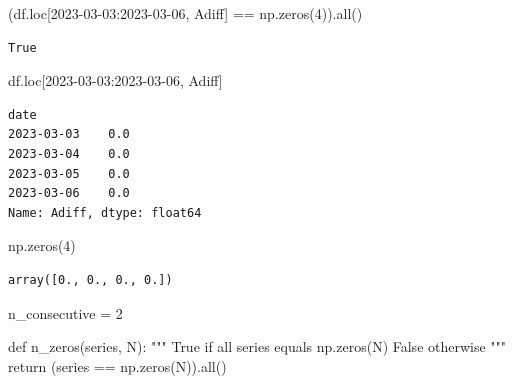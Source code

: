 \documentclass[
  letterpaper,
  DIV=11,
  numbers=noendperiod,
  oneside]{scrreprt}
\newenvironment{Shaded}{\begin{snugshade}}{\end{snugshade}}
\newcommand{\BuiltInTok}[1]{\textcolor[rgb]{0.00,0.23,0.31}{#1}}
\newcommand{\CommentTok}[1]{\textcolor[rgb]{0.37,0.37,0.37}{#1}}
\newcommand{\ControlFlowTok}[1]{\textcolor[rgb]{0.00,0.23,0.31}{#1}}
\newcommand{\DecValTok}[1]{\textcolor[rgb]{0.68,0.00,0.00}{#1}}
\newcommand{\KeywordTok}[1]{\textcolor[rgb]{0.00,0.23,0.31}{#1}}
\newcommand{\NormalTok}[1]{\textcolor[rgb]{0.00,0.23,0.31}{#1}}
\newcommand{\OperatorTok}[1]{\textcolor[rgb]{0.37,0.37,0.37}{#1}}
\newcommand{\StringTok}[1]{\textcolor[rgb]{0.13,0.47,0.30}{#1}}
\begin{document}
\begin{Shaded}
\begin{Highlighting}[]
\NormalTok{(df.loc[}\StringTok{\textquotesingle{}2023{-}03{-}03\textquotesingle{}}\NormalTok{:}\StringTok{\textquotesingle{}2023{-}03{-}06\textquotesingle{}}\NormalTok{, }\StringTok{\textquotesingle{}Adiff\textquotesingle{}}\NormalTok{] }\OperatorTok{==}\NormalTok{ np.zeros(}\DecValTok{4}\NormalTok{)).}\BuiltInTok{all}\NormalTok{()}
\end{Highlighting}
\end{Shaded}

\begin{verbatim}
True
\end{verbatim}

\begin{Shaded}
\begin{Highlighting}[]
\NormalTok{df.loc[}\StringTok{\textquotesingle{}2023{-}03{-}03\textquotesingle{}}\NormalTok{:}\StringTok{\textquotesingle{}2023{-}03{-}06\textquotesingle{}}\NormalTok{, }\StringTok{\textquotesingle{}Adiff\textquotesingle{}}\NormalTok{]}
\end{Highlighting}
\end{Shaded}

\begin{verbatim}
date
2023-03-03    0.0
2023-03-04    0.0
2023-03-05    0.0
2023-03-06    0.0
Name: Adiff, dtype: float64
\end{verbatim}

\begin{Shaded}
\begin{Highlighting}[]
\NormalTok{np.zeros(}\DecValTok{4}\NormalTok{)}
\end{Highlighting}
\end{Shaded}

\begin{verbatim}
array([0., 0., 0., 0.])
\end{verbatim}

\begin{Shaded}
\begin{Highlighting}[]
\NormalTok{n\_consecutive }\OperatorTok{=} \DecValTok{2}

\KeywordTok{def}\NormalTok{ n\_zeros(series, N):}
    \CommentTok{"""}
\CommentTok{    True if all series equals np.zeros(N)}
\CommentTok{    False otherwise}
\CommentTok{    """}
    \ControlFlowTok{return}\NormalTok{ (series }\OperatorTok{==}\NormalTok{ np.zeros(N)).}\BuiltInTok{all}\NormalTok{()}
\end{Highlighting}
\end{Shaded}
\end{document}
